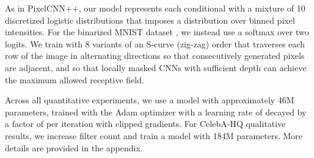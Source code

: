 \documentclass[letterpaper]{article}
\begin{document}
As in PixelCNN++, our model represents each conditional with a mixture of 10 discretized logistic distributions that imposes a distribution over binned pixel intensities. For the binarized MNIST dataset \citep{salakhutdinov2008quantitative}, we instead use a softmax over two logits. We train with 8 variants of an S-curve (zig-zag) order that traverses each row of the image in alternating directions so that consecutively generated pixels are adjacent, and so that locally masked CNNs with sufficient depth can achieve the maximum allowed receptive field.

Across all quantitative experiments, we use a model with approximately 46\textsc{M} parameters, trained with the Adam optimizer with a learning rate of  decayed by a factor of  per iteration with clipped gradients. For CelebA-HQ qualitative results, we increase filter count and train a model with 184\textsc{M} parameters. More details are provided in the appendix.

\begin{table}[t]
\caption{Average negative log likelihood of CIFAR10 images under our model. Lower is better.}
\label{table:bpd_cifar}
\begin{center}
\end{center}
\vspace{-2mm}
\end{table}
 
\end{document}

